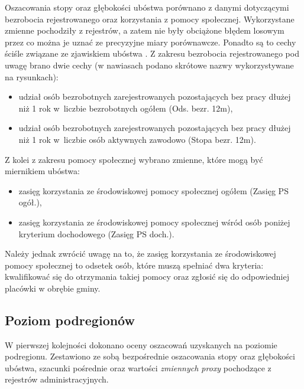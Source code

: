 Oszacowania stopy oraz głębokości ubóstwa porównano z danymi dotyczącymi bezrobocia rejestrowanego oraz korzystania z pomocy społecznej. Wykorzystane zmienne pochodziły z rejestrów, a zatem nie były obciążone błędem losowym przez co można je uznać ze precyzyjne miary porównawcze. Ponadto są to cechy ściśle związane ze zjawiskiem ubóstwa \citep{jakosc-gus2017}. Z zakresu bezrobocia rejestrowanego pod uwagę brano dwie cechy (w nawiasach podano skrótowe nazwy wykorzystywane na rysunkach):

\begin{itemize}
\item udział osób bezrobotnych zarejestrowanych pozostających bez pracy dłużej niż 1 rok w~liczbie bezrobotnych ogółem (Ods. bezr. 12m),
\item udział osób bezrobotnych zarejestrowanych pozostających bez pracy dłużej niż 1 rok w~liczbie osób aktywnych zawodowo (Stopa bezr. 12m).
\end{itemize}

Z kolei z zakresu pomocy społecznej wybrano zmienne, które mogą być miernikiem ubóstwa:

\begin{itemize}
\item zasięg korzystania ze środowiskowej pomocy społecznej ogółem (Zasięg PS ogół.),
\item zasięg korzystania ze środowiskowej pomocy społecznej wśród osób poniżej kryterium dochodowego (Zasięg PS doch.).
\end{itemize}

Należy jednak zwrócić uwagę na to, że zasięg korzystania ze środowiskowej pomocy społecznej to odsetek osób, które muszą spełniać dwa kryteria: kwalifikować się do otrzymania takiej pomocy oraz zgłosić się do odpowiedniej placówki w obrębie gminy.

\subsection{Poziom podregionów}\label{pr:mer-podreg}

W pierwszej kolejności dokonano oceny oszacowań uzyskanych na poziomie podregionu. Zestawiono ze sobą bezpośrednie oszacowania stopy oraz głębokości ubóstwa, szacunki pośrednie oraz wartości \textit{zmiennych proxy} pochodzące z rejestrów administracyjnych.

